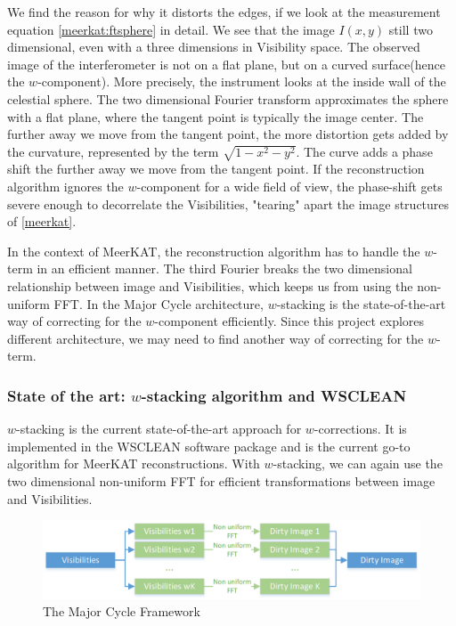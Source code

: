 We find the reason for why it distorts the edges, if we look at the measurement equation \eqref{meerkat:ftsphere} in detail. We see that the image $I(x,y)$ still two dimensional, even with a three dimensions in Visibility space. The observed image of the interferometer is not on a flat plane, but on a curved surface(hence the $w$-component). More precisely, the instrument looks at the inside wall of the celestial sphere. The two dimensional Fourier transform approximates the sphere with a flat plane, where the tangent point is typically the image center. The further away we move from the tangent point, the more distortion gets added by the curvature, represented by the term $\sqrt{1 - x^2 - y ^2}$. The curve adds a phase shift the further away we move from the tangent point. If the reconstruction algorithm ignores the $w$-component for a wide field of view, the phase-shift gets severe enough to decorrelate the Visibilities, "tearing" apart the image structures of \eqref{meerkat}.

In the context of MeerKAT, the reconstruction algorithm has to handle the $w$-term in an efficient manner. The third Fourier breaks the two dimensional relationship between image and Visibilities, which keeps us from using the non-uniform FFT. In the Major Cycle architecture, $w$-stacking is the state-of-the-art way of correcting for the $w$-component efficiently. Since this project explores different architecture, we may need to find another way of correcting for the $w$-term.


\subsubsection{State of the art: $w$-stacking algorithm and WSCLEAN}
$w$-stacking\cite{pratley2018fast} is the current state-of-the-art approach for $w$-corrections. It is implemented in the WSCLEAN software package and is the current go-to algorithm for MeerKAT reconstructions. With $w$-stacking, we can again use the two dimensional non-uniform FFT for efficient transformations between image and Visibilities.

\begin{figure}
	\centering
	\vspace{-10pt}
	\includegraphics[width=1.0\linewidth]{./chapters/03.challenges/w-stacks.png}
	\caption{The Major Cycle Framework}
	\label{meerkat:w-stacks}
	\vspace{-10pt}
\end{figure}

